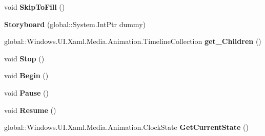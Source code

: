 \begin{DoxyCompactItemize}
void {\bfseries Skip\+To\+Fill} ()
\item 
\mbox{\label{class_windows_1_1_u_i_1_1_xaml_1_1_media_1_1_animation_1_1_storyboard_ac3faa5cda538d41cc59013f3f81f1655}} 
{\bfseries Storyboard} (global\+::\+System.\+Int\+Ptr dummy)
\item 
\mbox{\label{class_windows_1_1_u_i_1_1_xaml_1_1_media_1_1_animation_1_1_storyboard_ad0f6b9c0bedc7d1b44d1977fc371c08c}} 
global\+::\+Windows.\+U\+I.\+Xaml.\+Media.\+Animation.\+Timeline\+Collection {\bfseries get\+\_\+\+Children} ()
\item 
\mbox{\label{class_windows_1_1_u_i_1_1_xaml_1_1_media_1_1_animation_1_1_storyboard_aa40e1168c9cf5d0a608c601e86efc278}} 
void {\bfseries Stop} ()
\item 
\mbox{\label{class_windows_1_1_u_i_1_1_xaml_1_1_media_1_1_animation_1_1_storyboard_aebd7156a0b7f433f785472aa73411daa}} 
void {\bfseries Begin} ()
\item 
\mbox{\label{class_windows_1_1_u_i_1_1_xaml_1_1_media_1_1_animation_1_1_storyboard_ae4c08b52d0438fb4e059923d544e8af6}} 
void {\bfseries Pause} ()
\item 
\mbox{\label{class_windows_1_1_u_i_1_1_xaml_1_1_media_1_1_animation_1_1_storyboard_ad18fec80569ba300486c385391f2fc96}} 
void {\bfseries Resume} ()
\item 
\mbox{\label{class_windows_1_1_u_i_1_1_xaml_1_1_media_1_1_animation_1_1_storyboard_a633685fb262335d00b50b36515373160}} 
global\+::\+Windows.\+U\+I.\+Xaml.\+Media.\+Animation.\+Clock\+State {\bfseries Get\+Current\+State} ()
\item 
\mbox{\label{class_windows_1_1_u_i_1_1_xaml_1_1_media_1_1_animation_1_1_storyboard_ac88c93db5e691dd229f0f19a90e80af6}} 

\end{DoxyCompactItemize}
